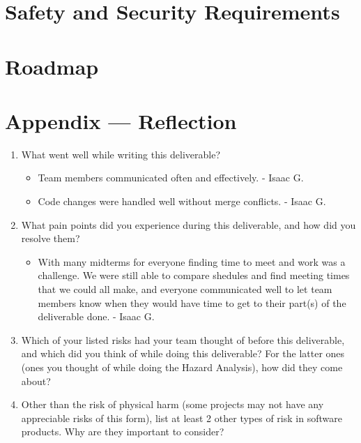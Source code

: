 \documentclass{article}
\begin{document}
\clearpage
\section{Safety and Security Requirements}


\section{Roadmap}


\newpage{}

\section*{Appendix --- Reflection}




\begin{enumerate}
    \item What went well while writing this deliverable?

    \begin{itemize}
        \item Team members communicated often and effectively. - Isaac G.
        \item Code changes were handled well without merge conflicts. - Isaac G.
	\end{itemize}

    \item What pain points did you experience during this deliverable, and how
    did you resolve them?

    \begin{itemize}
        \item With many midterms for everyone finding time to meet and work was a challenge. We were still able to compare shedules and find meeting times that we could all make, and everyone communicated well to let team members know when they would have time to get to their part(s) of the deliverable done. - Isaac G.
	\end{itemize}

    \item Which of your listed risks had your team thought of before this
    deliverable, and which did you think of while doing this deliverable? For
    the latter ones (ones you thought of while doing the Hazard Analysis), how
    did they come about?
    \item Other than the risk of physical harm (some projects may not have any
    appreciable risks of this form), list at least 2 other types of risk in
    software products. Why are they important to consider?
\end{enumerate}
\end{document}
